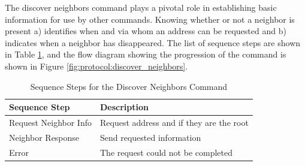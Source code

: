 The discover neighbors command plays a pivotal role in establishing basic information for use by other commands. Knowing whether or not a neighbor is present a) identifies when and via whom an address can be requested and b) indicates when a neighbor has disappeared. The list of sequence steps are shown in Table \ref{tab:protocol:discover_neighbors}, and the flow diagram showing the progression of the command is shown in Figure \ref{fig:protocol:discover_neighbors}.
\begin{table}
	\begin{center}
		\setlength{\extrarowheight}{1.5pt}
		\caption{Sequence Steps for the Discover Neighbors Command}
		\vspace{0.1cm}
		\begin{tabular}{|l|l|}
			\hline
			\textbf{Sequence Step} & \textbf{Description} \\
			\hline
			\hline
			Request Neighbor Info & Request address and if they are the root \\
			\hline
			Neighbor Response & Send requested information \\
			\hline
			Error & The request could not be completed \\
			\hline
		\end{tabular}
		\label{tab:protocol:discover_neighbors}
	\end{center}
\end{table}


